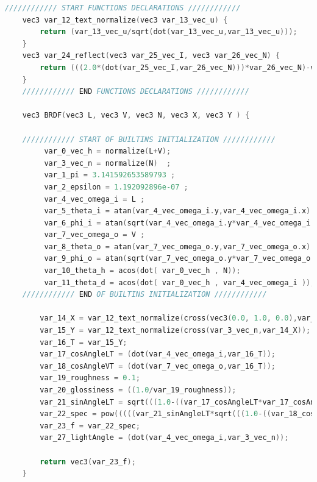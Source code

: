 \begin{codigo}[H]
    \caption{\small Saida do compilador, código GLSL da BRDF do experimento Kajiya-Kay (parte 2). }
    \label{cod-kajiya-eqlang}
\begin{lstlisting}[language=C, inputencoding=utf8]
    //////////// START FUNCTIONS DECLARATIONS ////////////
    vec3 var_12_text_normalize(vec3 var_13_vec_u) {
        return (var_13_vec_u/sqrt(dot(var_13_vec_u,var_13_vec_u)));
    }
    vec3 var_24_reflect(vec3 var_25_vec_I, vec3 var_26_vec_N) {
        return (((2.0*(dot(var_25_vec_I,var_26_vec_N)))*var_26_vec_N)-var_25_vec_I);
    }
    //////////// END FUNCTIONS DECLARATIONS ////////////

    vec3 BRDF(vec3 L, vec3 V, vec3 N, vec3 X, vec3 Y ) {

    //////////// START OF BUILTINS INITIALIZATION ////////////
         var_0_vec_h = normalize(L+V);
         var_3_vec_n = normalize(N)  ;
         var_1_pi = 3.141592653589793 ;
         var_2_epsilon = 1.192092896e-07 ;
         var_4_vec_omega_i = L ;
         var_5_theta_i = atan(var_4_vec_omega_i.y,var_4_vec_omega_i.x) ;
         var_6_phi_i = atan(sqrt(var_4_vec_omega_i.y*var_4_vec_omega_i.y+var_4_vec_omega_i.x*var_4_vec_omega_i.x),var_4_vec_omega_i.z) ;
         var_7_vec_omega_o = V ;
         var_8_theta_o = atan(var_7_vec_omega_o.y,var_7_vec_omega_o.x) ;
         var_9_phi_o = atan(sqrt(var_7_vec_omega_o.y*var_7_vec_omega_o.y+var_7_vec_omega_o.x*var_7_vec_omega_o.x),var_7_vec_omega_o.z) ;
         var_10_theta_h = acos(dot( var_0_vec_h , N));
         var_11_theta_d = acos(dot( var_0_vec_h , var_4_vec_omega_i ));
    //////////// END OF BUILTINS INITIALIZATION ////////////

        var_14_X = var_12_text_normalize(cross(vec3(0.0, 1.0, 0.0),var_3_vec_n));
        var_15_Y = var_12_text_normalize(cross(var_3_vec_n,var_14_X));
        var_16_T = var_15_Y;
        var_17_cosAngleLT = (dot(var_4_vec_omega_i,var_16_T));
        var_18_cosAngleVT = (dot(var_7_vec_omega_o,var_16_T));
        var_19_roughness = 0.1;
        var_20_glossiness = ((1.0/var_19_roughness));
        var_21_sinAngleLT = sqrt(((1.0-((var_17_cosAngleLT*var_17_cosAngleLT)))));
        var_22_spec = pow(((((var_21_sinAngleLT*sqrt(((1.0-((var_18_cosAngleVT*var_18_cosAngleVT)))))))-((var_17_cosAngleLT*var_18_cosAngleVT)))),var_20_glossiness);
        var_23_f = var_22_spec;
        var_27_lightAngle = (dot(var_4_vec_omega_i,var_3_vec_n));

        return vec3(var_23_f);
    }
\end{lstlisting}
\end{codigo}



